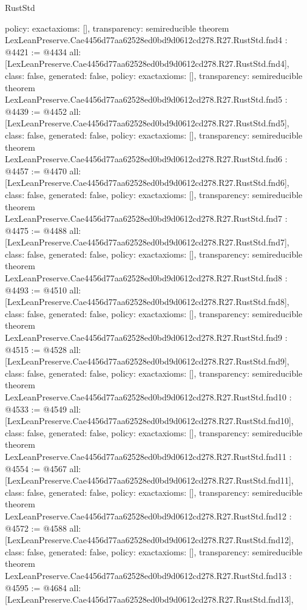 \begin{lexlean}{RustStd}
\begin{coremodule}
{  policy: exact{axioms: []},
  transparency: semireducible
}
theorem LexLeanPreserve.Cae4456d77aa62528ed0bd9d0612cd278.R27.RustStd.fnd4 : @4421 := @4434 {
  all: [LexLeanPreserve.Cae4456d77aa62528ed0bd9d0612cd278.R27.RustStd.fnd4],
  class: false,
  generated: false,
  policy: exact{axioms: []},
  transparency: semireducible
}
theorem LexLeanPreserve.Cae4456d77aa62528ed0bd9d0612cd278.R27.RustStd.fnd5 : @4439 := @4452 {
  all: [LexLeanPreserve.Cae4456d77aa62528ed0bd9d0612cd278.R27.RustStd.fnd5],
  class: false,
  generated: false,
  policy: exact{axioms: []},
  transparency: semireducible
}
theorem LexLeanPreserve.Cae4456d77aa62528ed0bd9d0612cd278.R27.RustStd.fnd6 : @4457 := @4470 {
  all: [LexLeanPreserve.Cae4456d77aa62528ed0bd9d0612cd278.R27.RustStd.fnd6],
  class: false,
  generated: false,
  policy: exact{axioms: []},
  transparency: semireducible
}
theorem LexLeanPreserve.Cae4456d77aa62528ed0bd9d0612cd278.R27.RustStd.fnd7 : @4475 := @4488 {
  all: [LexLeanPreserve.Cae4456d77aa62528ed0bd9d0612cd278.R27.RustStd.fnd7],
  class: false,
  generated: false,
  policy: exact{axioms: []},
  transparency: semireducible
}
theorem LexLeanPreserve.Cae4456d77aa62528ed0bd9d0612cd278.R27.RustStd.fnd8 : @4493 := @4510 {
  all: [LexLeanPreserve.Cae4456d77aa62528ed0bd9d0612cd278.R27.RustStd.fnd8],
  class: false,
  generated: false,
  policy: exact{axioms: []},
  transparency: semireducible
}
theorem LexLeanPreserve.Cae4456d77aa62528ed0bd9d0612cd278.R27.RustStd.fnd9 : @4515 := @4528 {
  all: [LexLeanPreserve.Cae4456d77aa62528ed0bd9d0612cd278.R27.RustStd.fnd9],
  class: false,
  generated: false,
  policy: exact{axioms: []},
  transparency: semireducible
}
theorem LexLeanPreserve.Cae4456d77aa62528ed0bd9d0612cd278.R27.RustStd.fnd10 : @4533 := @4549 {
  all: [LexLeanPreserve.Cae4456d77aa62528ed0bd9d0612cd278.R27.RustStd.fnd10],
  class: false,
  generated: false,
  policy: exact{axioms: []},
  transparency: semireducible
}
theorem LexLeanPreserve.Cae4456d77aa62528ed0bd9d0612cd278.R27.RustStd.fnd11 : @4554 := @4567 {
  all: [LexLeanPreserve.Cae4456d77aa62528ed0bd9d0612cd278.R27.RustStd.fnd11],
  class: false,
  generated: false,
  policy: exact{axioms: []},
  transparency: semireducible
}
theorem LexLeanPreserve.Cae4456d77aa62528ed0bd9d0612cd278.R27.RustStd.fnd12 : @4572 := @4588 {
  all: [LexLeanPreserve.Cae4456d77aa62528ed0bd9d0612cd278.R27.RustStd.fnd12],
  class: false,
  generated: false,
  policy: exact{axioms: []},
  transparency: semireducible
}
theorem LexLeanPreserve.Cae4456d77aa62528ed0bd9d0612cd278.R27.RustStd.fnd13 : @4595 := @4684 {
  all: [LexLeanPreserve.Cae4456d77aa62528ed0bd9d0612cd278.R27.RustStd.fnd13],
}
\end{coremodule}
\end{lexlean}
